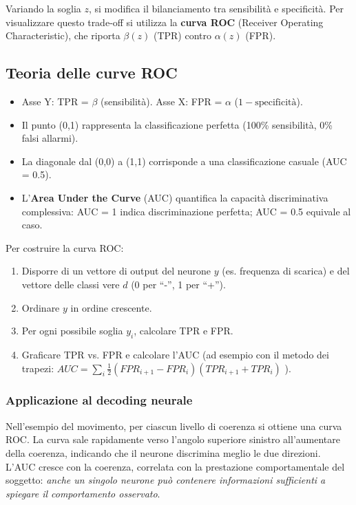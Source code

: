 Variando la soglia $z$, si modifica il bilanciamento tra sensibilità e specificità. Per visualizzare questo trade‑off si utilizza la \textbf{curva ROC} (Receiver Operating Characteristic), che riporta $\beta(z)$ (TPR) contro $\alpha(z)$ (FPR).

\subsection{Teoria delle curve ROC}
\begin{itemize}
  \item Asse Y: TPR = $\beta$ (sensibilità). Asse X: FPR = $\alpha$ ($1 - \text{specificità}$).
  \item Il punto (0,1) rappresenta la classificazione perfetta (100\% sensibilità, 0\% falsi allarmi).
  \item La diagonale dal (0,0) a (1,1) corrisponde a una classificazione casuale (AUC = 0.5).
  \item L’\textbf{Area Under the Curve} (AUC) quantifica la capacità discriminativa complessiva: AUC = 1 indica discriminazione perfetta; AUC = 0.5 equivale al caso.
\end{itemize}

Per costruire la curva ROC:
\begin{enumerate}
  \item Disporre di un vettore di output del neurone $y$ (es. frequenza di scarica) e del vettore delle classi vere $d$ (0 per ``-'', 1 per ``+'').
  \item Ordinare $y$ in ordine crescente.
  \item Per ogni possibile soglia $y_i$, calcolare TPR e FPR.
  \item Graficare TPR vs. FPR e calcolare l’AUC (ad esempio con il metodo dei trapezi: $AUC = \sum_{i} \frac{1}{2}(FPR_{i+1}-FPR_i)(TPR_{i+1}+TPR_i)$ ).
\end{enumerate}

\subsubsection{Applicazione al decoding neurale}
Nell’esempio del movimento, per ciascun livello di coerenza si ottiene una curva ROC. La curva sale rapidamente verso l’angolo superiore sinistro all’aumentare della coerenza, indicando che il neurone discrimina meglio le due direzioni. L’AUC cresce con la coerenza, correlata con la prestazione comportamentale del soggetto: \emph{anche un singolo neurone può contenere informazioni sufficienti a spiegare il comportamento osservato}.

